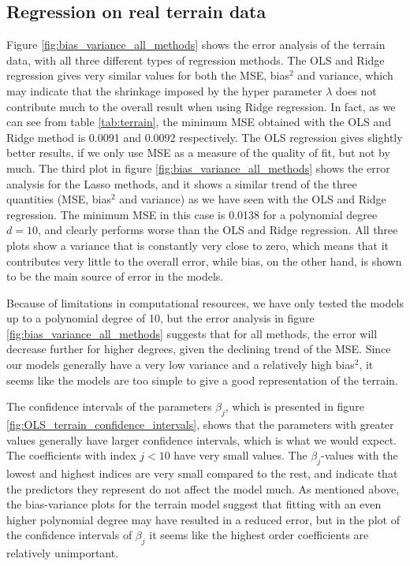 \subsection{Regression on real terrain data}

Figure \ref{fig:bias_variance_all_methods} shows the error analysis of the terrain data, with all three different types of regression methods. The OLS and Ridge regression gives very similar values for both the MSE, bias$^2$ and variance, which may indicate that the shrinkage imposed by the hyper parameter $\lambda$ does not contribute much to the overall result when using Ridge regression. In fact, as we can see from table \ref{tab:terrain}, the minimum MSE obtained with the OLS and Ridge method is 0.0091 and 0.0092 respectively. The OLS regression gives slightly better results, if we only use MSE as a measure of the quality of fit, but not by much. The third plot in figure \ref{fig:bias_variance_all_methods} shows the error analysis for the Lasso methods, and it shows a similar trend of the three quantities (MSE, bias$^2$ and variance) as we have seen with the OLS and Ridge regression. The minimum MSE in this case is 0.0138 for a polynomial degree $d = 10$, and clearly performs worse than the OLS and Ridge regression. All three plots show a variance that is constantly very close to zero, which means that it contributes very little to the overall error, while bias, on the other hand, is shown to be the main source of error in the models. 

Because of limitations in computational resources, we have only tested the models up to a polynomial degree of 10, but the error analysis in figure \ref{fig:bias_variance_all_methods} suggests that for all methods, the error will decrease further for higher degrees, given the declining trend of the MSE. Since our models generally have a very low variance and a relatively high bias$^2$, it seems like the models are too simple to give a good representation of the terrain.

The confidence intervals of the parameters $\beta_j$, which is presented in figure \ref{fig:OLS_terrain_confidence_intervals}, shows that the parameters with greater values generally have larger confidence intervals, which is what we would expect. The coefficients with index $j<10$ have very small values. The $\beta_j$-values with the lowest and highest indices are very small compared to the rest, and indicate that the predictors they represent do not affect the model much. As mentioned above, the bias-variance plots for the terrain model suggest that fitting with an even higher polynomial degree may have resulted in a reduced error, but in the plot of the confidence intervals of $\beta_j$ it seems like the highest order coefficients are relatively unimportant.

